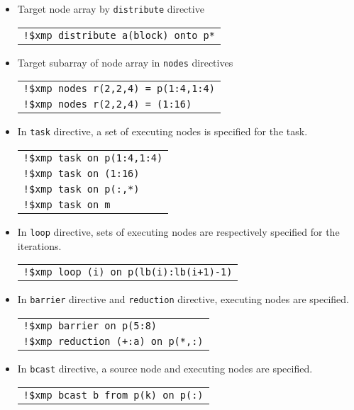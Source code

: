 \begin{itemize}
\item Target node array by {\tt distribute} directive

\begin{tabular}{l}
\verb|!$xmp distribute a(block) onto p*| \\
\end{tabular}

\item Target subarray of node array in {\tt nodes} directives 

\begin{tabular}{l}
\verb|!$xmp nodes r(2,2,4) = p(1:4,1:4)| \\
\verb|!$xmp nodes r(2,2,4) = (1:16)| \\
\end{tabular}

\item In {\tt task} directive, a set of executing nodes is specified for the task.

\begin{tabular}{l}
\verb|!$xmp task on p(1:4,1:4)| \\
\verb|!$xmp task on (1:16)| \\
\verb|!$xmp task on p(:,*)| \\
\verb|!$xmp task on m| \\
\end{tabular}

\item In {\tt loop} directive, sets of executing nodes are respectively specified for the iterations.
\begin{tabular}{l}
\verb|!$xmp loop (i) on p(lb(i):lb(i+1)-1)| \\
\end{tabular}

\item In {\tt barrier} directive and {\tt reduction} directive,
executing nodes are specified. 

\begin{tabular}{l}
\verb|!$xmp barrier on p(5:8)| \\
\verb|!$xmp reduction (+:a) on p(*,:)| \\
\end{tabular}

\item In {\tt bcast} directive, a source node and executing nodes are specified.

\begin{tabular}{l}
\verb|!$xmp bcast b from p(k) on p(:)| \\
\end{tabular}
\end{itemize}

